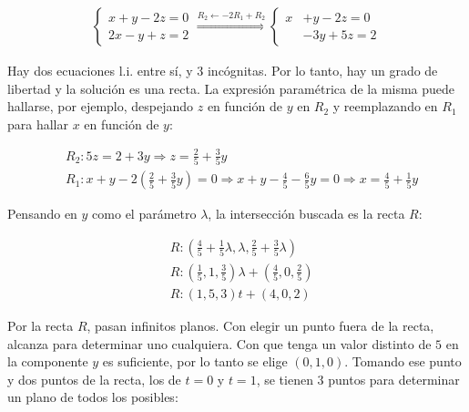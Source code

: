 \documentclass{article}
\begin{document}
\begin{subequations}
\begin{align}
\left\{
\begin{array}{ll}
x + y -2z = 0 \\
2x -y + z = 2
\end{array}
\right. \overset{R_2 \leftarrow -2R_1 + R_2}{\Longrightarrow}
\left\{
\begin{array}{ll}
x & + y -2z = 0 \\
  & - 3y + 5z = 2
\end{array}
\right.
\end{align}
\end{subequations}

Hay dos ecuaciones l.i. entre sí, y 3 incógnitas. Por lo tanto, hay un grado de libertad y la solución es una recta. La expresión paramétrica de la misma puede hallarse, por ejemplo, despejando $z$ en función de $y$ en $R_2$ y reemplazando en $R_1$ para hallar $x$ en función de $y$:

\begin{subequations}
\begin{align}
& R_2: 5z = 2 + 3y \Rightarrow z = \frac{2}{5} + \frac{3}{5} y \\
& R_1: x + y - 2 \left( \frac{2}{5} + \frac{3}{5} y \right) = 0 \Rightarrow x + y -\frac{4}{5} - \frac{6}{5} y = 0 \Rightarrow x = \frac{4}{5} + \frac{1}{5} y
\end{align}
\end{subequations}

Pensando en $y$ como el parámetro $\lambda$, la intersección buscada es la recta $R$:

\begin{subequations}
\begin{align}
& R: \left( \frac{4}{5} + \frac{1}{5} \lambda, \lambda, \frac{2}{5} + \frac{3}{5} \lambda \right) \\
& R: \left(\frac{1}{5}, 1, \frac{3}{5} \right) \lambda + \left(\frac{4}{5}, 0, \frac{2}{5} \right) \\
& R: (1, 5, 3) t + (4, 0, 2)
\end{align}
\end{subequations}

Por la recta $R$, pasan infinitos planos. Con elegir un punto fuera de la recta, alcanza para determinar uno cualquiera. Con que tenga un valor distinto de $5$ en la componente $y$ es suficiente, por lo tanto se elige $(0, 1, 0)$. Tomando ese punto y dos puntos de la recta, los de $t=0$ y $t=1$, se tienen 3 puntos para determinar un plano de todos los posibles:
\end{document}
